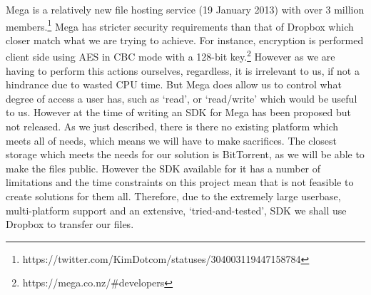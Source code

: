 \documentclass[12pt, titlepage]{article}
\begin{document}
\newline \indent Mega is a relatively new file hosting service (19 January 2013) with over 3 million members.\footnote{https://twitter.com/KimDotcom/statuses/304003119447158784} Mega  has stricter security requirements than that of Dropbox which closer match what we are trying to achieve. For instance, encryption is performed client side using AES in CBC mode with a 128-bit key.\footnote{https://mega.co.nz/\#developers} However as we are having to perform this actions ourselves, regardless, it is irrelevant to us, if not a hindrance due to wasted CPU time. But Mega does allow us to control what degree of access a user has, such as `read', or `read/write' which would be useful to us. However at the time of writing an SDK for Mega has been proposed but not released.
\newline \indent As we just described, there is there no existing platform which meets all of needs, which means we will have to make sacrifices. The closest storage which meets the needs for our solution is BitTorrent, as we will be able to make the files public. However the SDK available for it has a number of limitations and the time constraints on this project mean that is not feasible to create solutions for them all. Therefore, due to the extremely large userbase, multi-platform support and an extensive, `tried-and-tested', SDK we shall use Dropbox to transfer our files.
\end{document}
